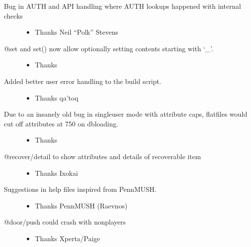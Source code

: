 \documentclass[letterpaper,10pt,english]{sphinxmanual}
\begin{document}
\begin{description}
\item[{Bug in AUTH and API handling where AUTH lookups happened with internal checks}] \leavevmode\begin{itemize}
\item {} 
\sphinxAtStartPar
Thanks Neil “Polk” Stevens

\end{itemize}

\item[{@set and set() now allow optionally setting contents starting with ‘\_’.}] \leavevmode\begin{itemize}
\item {} 
\sphinxAtStartPar
Thanks 

\end{itemize}

\item[{Added better user error handling to the build script.}] \leavevmode\begin{itemize}
\item {} 
\sphinxAtStartPar
Thanks qa’toq

\end{itemize}

\item[{Due to an insanely old bug in singleuser mode with attribute caps, flatfiles would cut off attributes at 750 on dbloading.}] \leavevmode\begin{itemize}
\item {} 
\sphinxAtStartPar
Thanks 

\end{itemize}

\item[{@recover/detail to show attributes and details of recoverable item}] \leavevmode\begin{itemize}
\item {} 
\sphinxAtStartPar
Thanks Ixokai

\end{itemize}

\item[{Suggestions in help files inspired from PennMUSH.}] \leavevmode\begin{itemize}
\item {} 
\sphinxAtStartPar
Thanks PennMUSH (Raevnos)

\end{itemize}

\item[{@door/push could crash with non\sphinxhyphen{}players}] \leavevmode\begin{itemize}
\item {} 
\sphinxAtStartPar
Thanks Xperta/Paige


\end{itemize}
\end{description}
\end{document}
